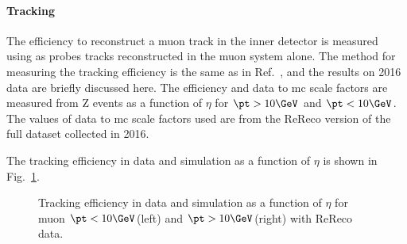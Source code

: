 \paragraph*{Tracking}
The efficiency to reconstruct a muon track in the inner detector is measured using as probes tracks
reconstructed in the muon system alone. The method for measuring the tracking efficiency is the same as 
 in Ref.~\cite{CMS_AN_2015-215}, and the results on 2016 data are briefly discussed here. The efficiency and 
data to mc scale factors are measured from Z events as a function of $\eta$ for $\pt > 10\GeV$ and $\pt < 10\GeV$. The values of data to mc scale factors 
used are from the ReReco version of the full dataset collected in 2016. 

The tracking efficiency in data and simulation as a function of $\eta$ is shown in Fig.~\ref{fig:MuonIDEff_4}.
\begin{figure}[htbp]
  \begin{center}
    \caption{Tracking efficiency in data and simulation as a function of $\eta$ for muon $\pt < 10\GeV$(left) and $\pt > 10\GeV$(right) with ReReco data.}
    \label{fig:MuonIDEff_4}
\end{center}
\end{figure}

